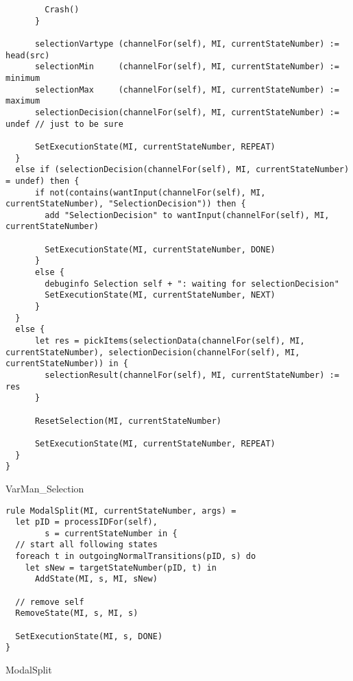 \begin{listing}[H]
\begin{verbatim}
        Crash()
      }

      selectionVartype (channelFor(self), MI, currentStateNumber) := head(src)
      selectionMin     (channelFor(self), MI, currentStateNumber) := minimum
      selectionMax     (channelFor(self), MI, currentStateNumber) := maximum
      selectionDecision(channelFor(self), MI, currentStateNumber) := undef // just to be sure

      SetExecutionState(MI, currentStateNumber, REPEAT)
  }
  else if (selectionDecision(channelFor(self), MI, currentStateNumber) = undef) then {
      if not(contains(wantInput(channelFor(self), MI, currentStateNumber), "SelectionDecision")) then {
        add "SelectionDecision" to wantInput(channelFor(self), MI, currentStateNumber)

        SetExecutionState(MI, currentStateNumber, DONE)
      }
      else {
        debuginfo Selection self + ": waiting for selectionDecision"
        SetExecutionState(MI, currentStateNumber, NEXT)
      }
  }
  else {
      let res = pickItems(selectionData(channelFor(self), MI, currentStateNumber), selectionDecision(channelFor(self), MI, currentStateNumber)) in {
        selectionResult(channelFor(self), MI, currentStateNumber) := res
      }

      ResetSelection(MI, currentStateNumber)

      SetExecutionState(MI, currentStateNumber, REPEAT)
  }
}
\end{verbatim}
\caption{VarMan_Selection}
\label{lst:asm:VarMan_Selection}
\end{listing}




\begin{listing}[H]
\begin{verbatim}
rule ModalSplit(MI, currentStateNumber, args) =
  let pID = processIDFor(self),
        s = currentStateNumber in {
  // start all following states
  foreach t in outgoingNormalTransitions(pID, s) do
    let sNew = targetStateNumber(pID, t) in
      AddState(MI, s, MI, sNew)

  // remove self
  RemoveState(MI, s, MI, s)

  SetExecutionState(MI, s, DONE)
}
\end{verbatim}
\caption{ModalSplit}
\label{lst:asm:ModalSplit}
\end{listing}




